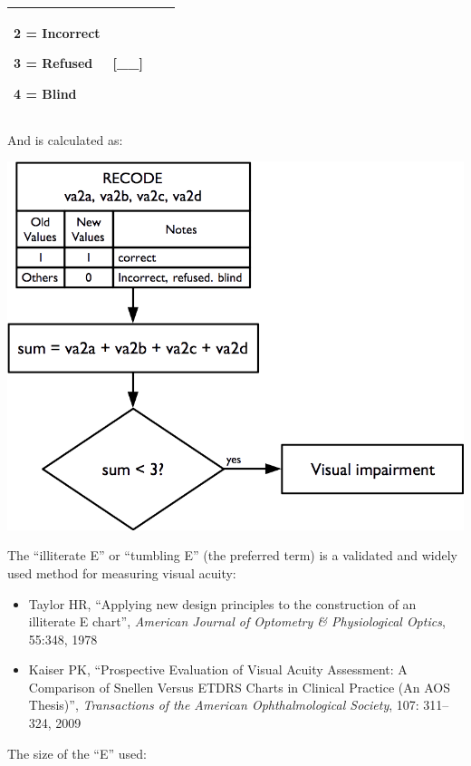 \documentclass[12pt,a4paper]{book}
\theoremstyle{definition}
\theoremstyle{definition}
\theoremstyle{definition}
\theoremstyle{remark}
\begin{document}
\begin{longtable}[]{@{}llll@{}}
\begin{minipage}[t]{0.24\columnwidth}
2 = Incorrect

3 = Refused

4 = Blind\strut
\end{minipage} & \begin{minipage}[t]{0.24\columnwidth}\raggedright
{[}\_\_{]}\strut
\end{minipage}\tabularnewline
\bottomrule
\end{longtable}

And is calculated as:

\begin{center}\includegraphics[width=800pt]{figures/indicators27} \end{center}

The ``illiterate E'' or ``tumbling E'' (the preferred term) is a
validated and widely used method for measuring visual acuity:

\begin{itemize}
\item
  Taylor HR, ``Applying new design principles to the construction of an
  illiterate E chart'', \emph{American Journal of Optometry \&
  Physiological Optics}, 55:348, 1978
\item
  Kaiser PK, ``Prospective Evaluation of Visual Acuity Assessment: A
  Comparison of Snellen Versus ETDRS Charts in Clinical Practice (An AOS
  Thesis)'', \emph{Transactions of the American Ophthalmological
  Society}, 107: 311--324, 2009
\end{itemize}

The size of the ``E'' used:
\end{document}
